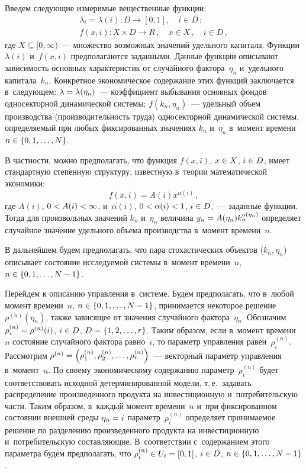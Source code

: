 \begin{multicols}{2}
     Введем следующие измеримые вещественные функции: 
     \begin{gather*}
     \lambda_i=\lambda(i): D\to [0,1],\quad i\in D\,;\\
     f(x,i): X\times D\to R\,, \quad x\in X\,,\quad i\in D\,,
     \end{gather*}
где $X\subseteq [0,\infty)$~--- множество возможных значений удельного капитала. 
Функции $\lambda(i)$ и~$f(x,i)$ предполагаются заданными. Данные функции 
описывают зависимость основных характеристик от случайного фактора~$\eta_n$ 
и~удельного капитала~$k_n$. Конкретное экономическое содержание этих 
функций заключается в~следующем: $\lambda\hm= \lambda(\eta_n)$~--- коэффициент 
выбывания основных фондов односекторной динамической системы; $f(k_n, 
\eta_n)$~--- удельный объем производства (производительность труда) 
односекторной динамической сис\-те\-мы, определяемый при любых фиксированных 
значениях $k_n$ и~$\eta_n$ в~момент времени $n\hm\in \{0,1,\ldots , N\}$.
     
     В частности, можно предполагать, что функция $f(x,i)$, $x\hm\in X$, $i\hm\in 
D$, имеет стандартную степенную структуру, известную в~теории математической 
экономики: 
     $$
     f(x,i)=A(i) x^{\alpha(i)}\,,
     $$
     где $A(i)$, $0\hm< A(i)\hm <\infty$, и~$\alpha(i)$, $0\hm< \alpha(i)\hm< 1$, $i\hm\in D$,~--- 
заданные функции. Тогда для произвольных значений $k_n$ и~$\eta_n$ величина 
$y_n\hm= A(\eta_n) k_n^{a(\eta_n)}$ определяет случайное значение удельного 
объема производства в~момент времени~$n$.
      
     В дальнейшем будем предполагать, что пара стохастических объектов 
($k_n,\eta_n$) описывает со\-сто\-яние ис\-сле\-ду\-емой сис\-те\-мы в~момент времени~$n$,  
$n\hm\in \{0,1,\ldots , N\hm-1\}$.
     
     Перейдем к описанию управления в~системе. Будем предполагать, что 
в~любой момент времени~$n$, $n\hm\in \{0,1,\ldots , N\hm-1\}$, принимается 
некоторое решение~$\rho^{(n)}(\eta_n)$, также зависящее от значения случайного 
фактора~$\eta_n$. Обозначим $\rho_i^{(n)} \hm= \rho^{(n)}(i)$, $i\hm\in D$, $D\hm= 
\{1,2,\ldots , r\}$. Таким образом, если в~момент времени~$n$ состояние 
случайного фактора равно~$i$, то параметр управ\-ле\-ния равен~$\rho_i^{(n)}$. 
Рассмотрим $\rho^{(n)} \hm= \left( \rho_1^{(n)}, \rho_2^{(n)}, \ldots , 
\rho_r^{(n)}\right)$~--- векторный параметр управ\-ле\-ния в~момент~$n$. По своему 
экономическому содержанию параметр~$\rho_i^{(n)}$ будет соответствовать 
исходной детерминированной модели, т.\,е.\ задавать распределение 
произведенного продукта на инвестиционную и~потребительскую час\-ти. Таким 
образом, в~каждый момент времени~$n$ и~при фиксированном состоянии 
внешней среды $\eta_n\hm= i$ параметр~$\rho_i^{(n)}$ определяет принимаемое 
решение по разделению произведенного продукта на инвестиционную 
и~потребительскую со\-став\-ля\-ющие. В~соответствии с~содержанием этого 
па\-ра\-мет\-ра будем предполагать, что $\rho_i^{(n)}\hm\in U_i\hm= [0,1]$, $i\hm\in D$, 
$n\hm\in \{0,1,\ldots , N\hm-1\}$.
     

\end{multicols}
